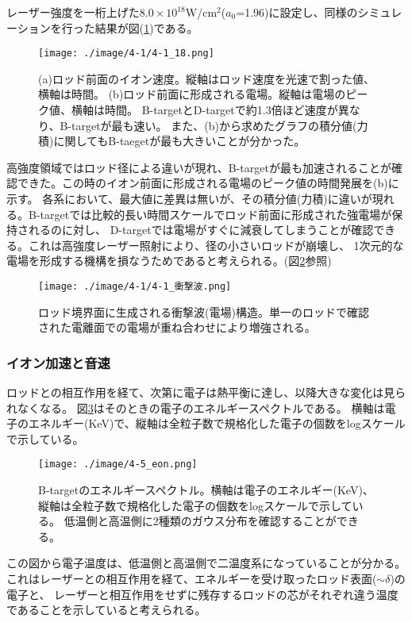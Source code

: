 \documentclass[a4paper,11pt,titlepage]{jsarticle}
\begin{document}
    レーザー強度を一桁上げた$8.0 \times 10^{18}$W/cm$^2$($a_0$=1.96)に設定し、同様のシミュレーションを行った結果が図(\ref{fig:4-1_18})である。
    \begin{figure}[H]
      \begin{center}
        \texttt{[image: ./image/4-1/4-1\_18.png]}
        \caption{
          \label{fig:4-1_18}
           (a)ロッド前面のイオン速度。縦軸はロッド速度を光速で割った値、横軸は時間。
           (b)ロッド前面に形成される電場。縦軸は電場のピーク値、横軸は時間。
           B-targetとD-targetで約1.3倍ほど速度が異なり、B-targetが最も速い。
           また、(b)から求めたグラフの積分値(力積)に関してもB-taegetが最も大きいことが分かった。
        }
      \end{center}
    \end{figure}
    高強度領域ではロッド径による違いが現れ、B-targetが最も加速されることが確認できた。この時のイオン前面に形成される電場のピーク値の時間発展を(b)に示す。
    各系において、最大値に差異は無いが、その積分値(力積)に違いが現れる。B-targetでは比較的長い時間スケールでロッド前面に形成された強電場が保持されるのに対し、
    D-targetでは電場がすぐに減衰してしまうことが確認できる。これは高強度レーザー照射により、径の小さいロッドが崩壊し、
    1次元的な電場を形成する機構を損なうためであると考えられる。(図\ref{fig:4-1_衝撃波}参照)
    \begin{figure}[H]
      \begin{center}
        \texttt{[image: ./image/4-1/4-1\_衝撃波.png]}
        \caption{
          \label{fig:4-1_衝撃波}
           ロッド境界面に生成される衝撃波(電場)構造。単一のロッドで確認された電離面での電場が重ね合わせにより増強される。
        }
      \end{center}
    \end{figure}
    \subsubsection{イオン加速と音速}
    ロッドとの相互作用を経て、次第に電子は熱平衡に達し、以降大きな変化は見られなくなる。
    図\ref{fig:4-5_eon}はそのときの電子のエネルギースペクトルである。
    横軸は電子のエネルギー(KeV)で、縦軸は全粒子数で規格化した電子の個数をlogスケールで示している。
    \begin{figure}[H]
      \begin{center}
        \texttt{[image: ./image/4-5\_eon.png]}
        \caption{
          \label{fig:4-5_eon}
          B-targetのエネルギースペクトル。横軸は電子のエネルギー(KeV)、縦軸は全粒子数で規格化した電子の個数をlogスケールで示している。
          低温側と高温側に2種類のガウス分布を確認することができる。
        }
      \end{center}
    \end{figure}
    この図から電子温度は、低温側と高温側で二温度系になっていることが分かる。
    これはレーザーとの相互作用を経て、エネルギーを受け取ったロッド表面($ \sim \delta$)の電子と、
    レーザーと相互作用をせずに残存するロッドの芯がそれぞれ違う温度であることを示していると考えられる。
\end{document}

